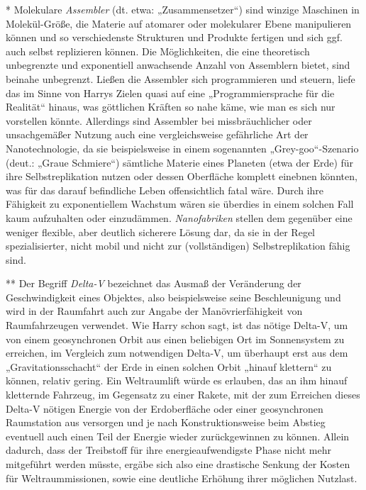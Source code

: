 {* Molekulare \emph{Assembler} (dt. etwa: „Zusammensetzer“) sind winzige Maschinen in Molekül-Größe, die Materie auf atomarer oder molekularer Ebene manipulieren können und so verschiedenste Strukturen und Produkte fertigen und sich ggf. auch selbst replizieren können. Die Möglichkeiten, die eine theoretisch unbegrenzte und exponentiell anwachsende Anzahl von Assemblern bietet, sind beinahe unbegrenzt. Ließen die Assembler sich programmieren und steuern, liefe das im Sinne von Harrys Zielen quasi auf eine „Programmiersprache für die Realität“ hinaus, was göttlichen Kräften so nahe käme, wie man es sich nur vorstellen könnte. Allerdings sind Assembler bei missbräuchlicher oder unsachgemäßer Nutzung auch eine vergleichsweise gefährliche Art der Nanotechnologie, da sie beispielsweise in einem sogenannten „Grey-goo“-Szenario (deut.: „Graue Schmiere“) sämtliche Materie eines Planeten (etwa der Erde) für ihre Selbstreplikation nutzen oder dessen Oberfläche komplett einebnen könnten, was für das darauf befindliche Leben offensichtlich fatal wäre. Durch ihre Fähigkeit zu exponentiellem Wachstum wären sie überdies in einem solchen Fall kaum aufzuhalten oder einzudämmen. \emph{Nanofabriken} stellen dem gegenüber eine weniger flexible, aber deutlich sicherere Lösung dar, da sie in der Regel spezialisierter, nicht mobil und nicht zur (vollständigen) Selbstreplikation fähig sind.

** Der Begriff \emph{Delta-V} bezeichnet das Ausmaß der Veränderung der Geschwindigkeit eines Objektes, also beispielsweise seine Beschleunigung und wird in der Raumfahrt auch zur Angabe der Manövrierfähigkeit von Raumfahrzeugen verwendet. Wie Harry schon sagt, ist das nötige Delta-V, um von einem geosynchronen Orbit aus einen beliebigen Ort im Sonnensystem zu erreichen, im Vergleich zum notwendigen Delta-V, um überhaupt erst aus dem „Gravitationsschacht“ der Erde in einen solchen Orbit „hinauf klettern“ zu können, relativ gering. Ein Weltraumlift würde es erlauben, das an ihm hinauf kletternde Fahrzeug, im Gegensatz zu einer Rakete, mit der zum Erreichen dieses Delta-V nötigen Energie von der Erdoberfläche oder einer geosynchronen Raumstation aus versorgen und je nach Konstruktionsweise beim Abstieg eventuell auch einen Teil der Energie wieder zurückgewinnen zu können. Allein dadurch, dass der Treibstoff für ihre energieaufwendigste Phase nicht mehr mitgeführt werden müsste, ergäbe sich also eine drastische Senkung der Kosten für Weltraummissionen, sowie eine deutliche Erhöhung ihrer möglichen Nutzlast.

}
